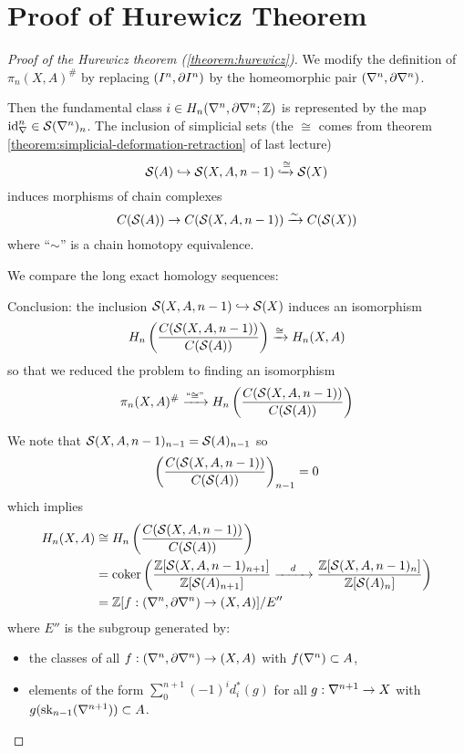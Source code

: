
\section{Proof of Hurewicz Theorem}


\begin{proof}[Proof of the Hurewicz theorem (\ref{theorem:hurewicz})]
We modify the definition of $\pi_n(X,A)^\#$ by replacing $\pair$ by the homeomorphic pair $(\ns,\de\ns)$.

Then the fundamental class $i\in H_n(\ns,\de\ns;\Z)$ is represented by the map $\id_\ns\in\S(\ns)_n$. The inclusion of simplicial sets (the $\cong$ comes from theorem \ref{theorem:simplicial-deformation-retraction} of last lecture)
\[\S(A)\into\S(X,A,n-1)\xinto{\cong}\S(X)\]
induces morphisms of chain complexes
\[C(\S(A))\to C(\S(X,A,n-1))\xto{\sim}C(\S(X))\]
where \enquote{$\sim$} is a chain homotopy equivalence.

We compare the long exact homology sequences:
\begin{center}
    \small
\end{center}

Conclusion: the inclusion $\S(X,A,n-1)\into\S(X)$ induces an isomorphism
\[H_n\left(\frac{C(\S(X,A,n-1))}{C(\S(A))}\right)\xto{\cong} H_n(X,A)\]
so that we reduced the problem to finding an isomorphism
\[\pi_n(X,A)^\#\xto{``\cong"} H_n\left(\frac{C(\S(X,A,n-1))}{C(\S(A))}\right)\]

We note that $\S(X,A,\ni)_\ni=\S(A)_\ni$ so
\[\left(\frac{C(\S(X,A,n-1))}{C(\S(A))}\right)_\ni=0\]
which implies
\begin{align*}
    H_n(X,A)&\cong H_n\left(\frac{C(\S(X,A,n-1))}{C(\S(A))}\right) \\
    &=\coker\left(\frac{\Z[\S(X,A,\ni)_{n+1}]}{\Z[\S(A)_{n+1}]}\xto{\quad d\quad} \frac{\Z[\S(X,A,\ni)_n]}{\Z[\S(A)_n]}\right) \\
    &=\Z[f:(\ns,\de\ns)\to (X,A)]/E''
\end{align*}
where $E''$ is the subgroup generated by:
\begin{itemize}[label={-}]
    \item the classes of all $f:(\ns,\de\ns)\to(X,A)$ with $f(\ns)\subset A$,
    \item elements of the form $\sum_0^{n+1}(-1)^id_i^*(g)$ for all $g:\sx{n+1}\to X$ with $g(\sk_\ni(\sx{n+1}))\subset A$.
\end{itemize}


\end{proof}
